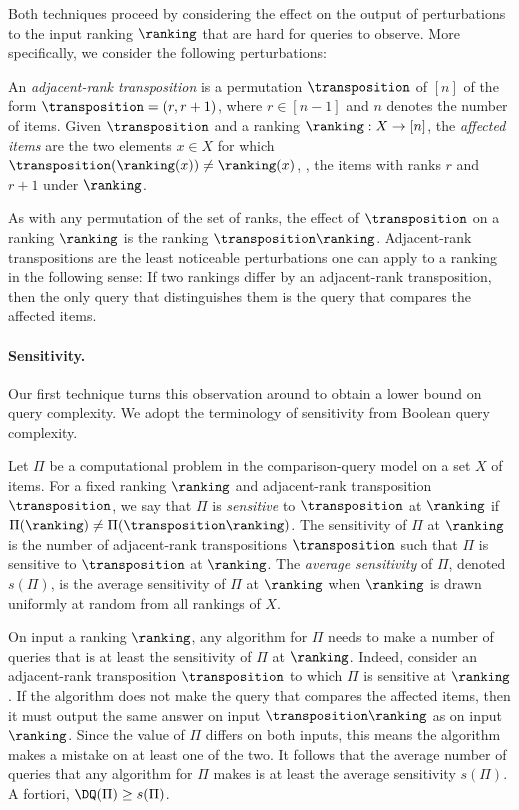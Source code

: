 \documentclass{toc}
\begin{document}
Both techniques proceed by considering the effect on the output of perturbations to the input ranking $\ranking$ that are hard for queries to observe. More specifically, we consider the following perturbations:
\begin{definition}
An \emph{adjacent-rank transposition} is a permutation $\transposition$ of $[n]$ of the form $\transposition = (r,r+1)$, where $r \in [n-1]$ and $n$ denotes the number of items. Given $\transposition$ and a ranking $\ranking: X \to [n]$, the \emph{affected items} are the two elements $x \in X$ for which $\transposition(\ranking(x)) \ne \ranking(x)$, \ie, the items with ranks $r$ and $r+1$ under $\ranking$. 
\end{definition}
As with any permutation of the set of ranks, the effect of $\transposition$ on a ranking $\ranking$ is the ranking $\transposition \ranking$. 
Adjacent-rank transpositions are the least noticeable perturbations one can apply to a ranking in the following sense: If two rankings differ by an adjacent-rank transposition, then the only query that distinguishes them is the query that compares the affected items. 

\paragraph{Sensitivity.}
Our first technique turns this observation around to obtain a lower bound on query complexity. We adopt the terminology of sensitivity from Boolean query complexity. 

\begin{definition}\label{def:sensitivity}
Let $\Pi$ be a computational problem in the comparison-query model on a set $X$ of items. For a fixed ranking $\ranking$ and adjacent-rank transposition $\transposition$, we say that $\Pi$ is \emph{sensitive} to $\transposition$ at $\ranking$ if $\Pi(\ranking) \ne \Pi(\transposition \ranking)$. The sensitivity of $\Pi$ at $\ranking$ is the number of adjacent-rank transpositions $\transposition$ such that $\Pi$ is sensitive to $\transposition$ at $\ranking$. The \emph{average sensitivity} of $\Pi$, denoted $s(\Pi)$, is the average sensitivity of $\Pi$ at $\ranking$ when $\ranking$ is drawn uniformly at random from all rankings of $X$.
\end{definition}
On input a ranking $\ranking$, any algorithm for $\Pi$ needs to make a number of queries that is at least the sensitivity of $\Pi$ at $\ranking$. Indeed, consider an adjacent-rank transposition $\transposition$ to which $\Pi$ is sensitive at $\ranking$. If the algorithm does not make the query that compares the affected items, then it must output the same answer on input $\transposition \ranking$ as on input $\ranking$. Since the value of $\Pi$ differs on both inputs, this means the algorithm makes a mistake on at least one of the two. It follows that the average number of queries that any algorithm for $\Pi$ makes is at least the average sensitivity $s(\Pi)$. A fortiori, $\DQ(\Pi) \ge s(\Pi)$. 
\end{document}
